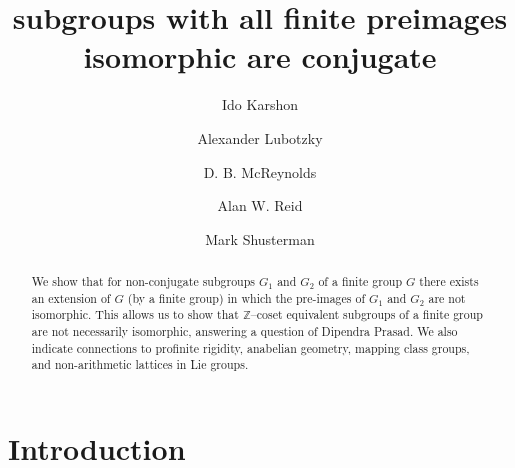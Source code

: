 \documentclass[11pt]{amsart}
\numberwithin{equation}{section}
\begin{document}
\title{subgroups with all finite preimages isomorphic are conjugate}

\author[Karshon]{Ido Karshon}
\author[Lubotzky]{Alexander Lubotzky}
\author[McReynolds]{D. B. McReynolds}
\author[Reid]{Alan W. Reid}
\author[Shusterman]{Mark Shusterman} 

\address{Faculty of Mathematics and Computer Science, Weizmann
Institute of Science, 234 Herzl Street, Rehovot 76100, Israel.}

\address{Faculty of Mathematics and Computer Science, Weizmann
Institute of Science, 234 Herzl Street, Rehovot 76100, Israel.}

\address{Department of Mathematics, Purdue University, West Lafayette, IN 47907}

\address{Department of Mathematics, Rice University, Houston, TX 77005. School of Mathematics, Korea Institute for Advanced Study (KIAS), Seoul, 02455, Korea.}

\address{Faculty of Mathematics and Computer Science, Weizmann
Institute of Science, 234 Herzl Street, Rehovot 76100, Israel.}

\begin{abstract}
We show that for non-conjugate subgroups $G_1$ and $G_2$ of a finite group $G$ there exists an extension of $G$ (by a finite group) in which the pre-images of $G_1$ and $G_2$ are not isomorphic. This allows us to show that $\mathbb Z$--coset equivalent subgroups of a finite group are not necessarily isomorphic, answering a question of Dipendra Prasad. We also indicate connections to profinite rigidity, anabelian geometry, mapping class groups, and non-arithmetic lattices in Lie groups.
\end{abstract}




\maketitle


\section{Introduction}
\end{document}
